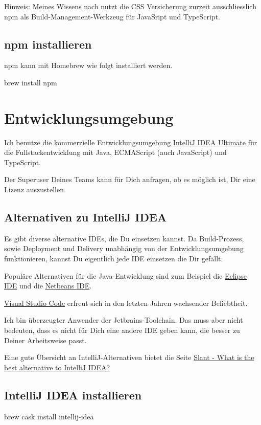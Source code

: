 \documentclass[]{article}
\begin{document}
Hinweis: Meines Wissens nach nutzt die CSS Versicherung zurzeit ausschliesslich npm als Build-Management-Werkzeug für JavaSript und TypeScript.

\subsection{npm installieren}
npm kann mit Homebrew wie folgt installiert werden.
\begin{bashcode}
brew install npm
\end{bashcode}

\section{Entwicklungsumgebung}
Ich benutze die kommerzielle Entwicklungsumgebung \href{https://www.jetbrains.com/idea/}{IntelliJ IDEA Ultimate} für die Fullstackentwicklung mit Java, ECMAScript (auch JavaScript) und TypeScript. 

Der Superuser Deines Teams kann für Dich anfragen, ob es möglich ist, Dir eine Lizenz auszustellen.

\subsection{Alternativen zu IntelliJ IDEA}
Es gibt diverse alternative IDEs, die Du einsetzen kannst. Da Build-Prozess, sowie Deployment und Delivery unabhängig von der Entwicklungsumgebung funktionieren, kannst Du eigentlich jede IDE einsetzen die Dir gefällt.

Populäre Alternativen für die Java-Entwicklung sind zum Beispiel die \href{https://www.eclipse.org/ide/}{Eclipse IDE} und die \href{https://netbeans.org/}{Netbeans IDE}.

\href{https://code.visualstudio.com/}{Visual Studio Code} erfreut sich in den letzten Jahren wachsender Beliebtheit.

Ich bin überzeugter Anwender der Jetbrains-Toolchain. Das muss aber nicht bedeuten, dass es nicht für Dich eine andere IDE geben kann, die besser zu Deiner Arbeitsweise passt.

Eine gute Übersicht an IntelliJ-Alternativen bietet die Seite \href{https://www.slant.co/options/1958/alternatives/~intellij-idea-alternatives}{Slant - What is the best alternative to IntelliJ IDEA?}

\subsection{IntelliJ IDEA installieren}
\begin{bashcode}
brew cask install intellij-idea
\end{bashcode}
\end{document}
